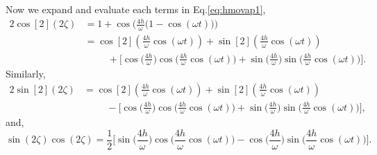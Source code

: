 \documentclass[12pt]{iopart}
\begin{document}
\noindent Now we expand and evaluate each terms in Eq.\eqref{eq:hmovap1},
\begin{align}
2\cos[2](2\zeta) &= 1 + \cos\Bigg(\frac{4h}{\omega}\big(1-\cos(\omega t)\big)\Bigg)\nonumber\\
&=\cos[2](\frac{4h}{\omega}\cos(\omega t))+ \sin[2](\frac{4h}{\omega}\cos(\omega t))\nonumber\\
&\hspace{1cm}+ \Bigg[\cos\Big(\frac{4h}{\omega}\Big)\cos\Big(\frac{4h}{\omega}\cos(\omega t)\Big) +\sin\Big(\frac{4h}{\omega}\Big)\sin\Big(\frac{4h}{\omega}\cos(\omega t)\Big)\Bigg].
\label{eq:cossqr}
\end{align}
Similarly,
\begin{align}
2\sin[2](2\zeta) &=\cos[2](\frac{4h}{\omega}\cos(\omega t))+ \sin[2](\frac{4h}{\omega}\cos(\omega t))\nonumber\\ 
&\hspace{1cm}-\Bigg[\cos\Big(\frac{4h}{\omega}\Big)\cos\Big(\frac{4h}{\omega}\cos(\omega t)\Big) + \sin\Big(\frac{4h}{\omega}\Big)\sin\Big(\frac{4h}{\omega}\cos(\omega t)\Big)\Bigg],
\label{eq:sinsqr}
\end{align}
and,
\begin{equation}
\sin(2\zeta) \cos(2\zeta)=\frac12\Bigg[ \sin\Big(\frac{4h}{\omega}\Big)\cos\Big(\frac{4h}{\omega}\cos(\omega t)\Big) -\cos\Big(\frac{4h}{\omega}\Big)\sin\Big(\frac{4h}{\omega}\cos(\omega t)\Big)\Bigg].
\label{eq:sincos}
\end{equation}
\end{document}
